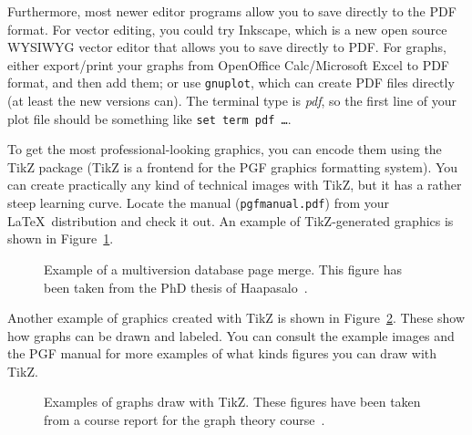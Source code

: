 \documentclass[12pt,a4paper,oneside,pdftex]{report}
\begin{document}

Furthermore, most newer editor programs allow you to save directly to the PDF
format. For vector editing, you could try Inkscape, which is a new open source
WYSIWYG vector editor that allows you to save directly to PDF\@.
For graphs, either export/print your graphs from OpenOffice Calc/Microsoft
Excel to PDF format, and then add them; or use \texttt{gnuplot}, which can
create PDF files directly (at least the new versions can).
The terminal type is \emph{pdf}, so the first line of your plot file should be
something like \texttt{set term pdf \ldots}.

To get the most professional-looking graphics, you can encode them using the
TikZ package (TikZ is a frontend for the PGF graphics formatting system).
You can create practically any kind of technical images with TikZ, but it has a
rather steep learning curve. Locate the manual (\texttt{pgfmanual.pdf}) from
your \LaTeX\ distribution and check it out. An example of TikZ-generated
graphics is shown in Figure~\ref{fig:page-merge}.

\begin{figure}[ht]
  \begin{center}
    
    \caption{Example of a multiversion database page merge. This figure has
    been taken from the PhD thesis of Haapasalo~\cite{HaapasaloThesis}.}
    \label{fig:page-merge}
  \end{center}
\end{figure}

Another example of graphics created with TikZ is shown in
Figure~\ref{fig:tikz-examples}.
These show how graphs can be drawn and labeled.
You can consult the example images and the PGF manual for more examples of what
kinds figures you can draw with TikZ.

\newlength{\graphdotsize}
\setlength{\graphdotsize}{1.7pt}
\newlength{\graphgridsize}
\setlength{\graphgridsize}{1.2em}
\begin{figure}[ht]
\begin{center}
\caption{Examples of graphs draw with TikZ. These figures have been taken from a
course report for the graph theory course~\cite{FerryProblem}.}
\label{fig:tikz-examples}
\end{center}
\end{figure}
\end{document}
